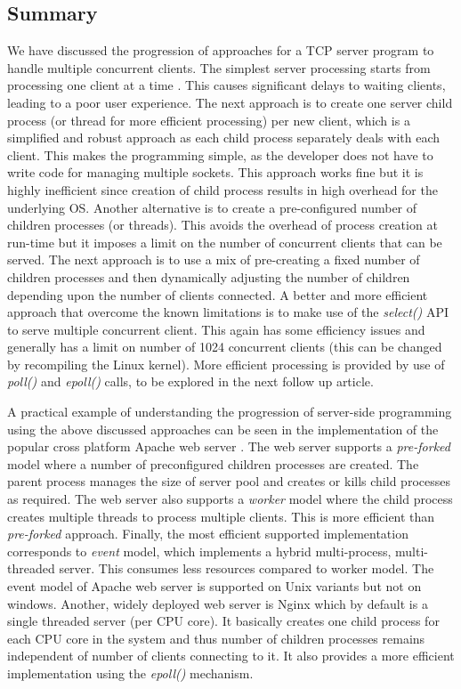 \begin{multicols}{2}
\section{Summary}

We have discussed the progression of approaches for a TCP server program to handle multiple concurrent clients. The simplest server processing starts from processing one client at a time . This causes significant delays to waiting clients, leading to a poor user experience. The next approach is to create one server child process (or thread for more efficient processing) per new client, which is a simplified and robust approach as each child process separately deals with each client. This makes the programming simple, as the developer does not have to write code for managing multiple sockets. This approach works fine but it is highly inefficient since creation of child process results in high overhead for the underlying OS. Another alternative is to create a pre-configured number of children processes (or threads). This avoids the overhead of process creation at run-time but it imposes a limit on the number of concurrent clients that can be served. The next approach is to use a mix of pre-creating a fixed number of children processes and then dynamically adjusting the number of children depending upon the number of clients connected. A better and more efficient approach that overcome the known limitations is to make use of the \textit{select()} API to serve multiple concurrent client. This again has some efficiency issues and generally has a limit on number of 1024 concurrent clients (this can be changed by recompiling the Linux kernel). More efficient processing is provided by use of \textit{poll()} and \textit{epoll()} calls, to be explored in the next follow up article.

A practical example of understanding the progression of server-side programming using the above discussed approaches can be seen in the implementation of the popular cross platform Apache web server \cite{art1-key04}. The web server supports a \textit{pre-forked} model where a number of preconfigured children processes are created. The parent process manages the size of server pool and creates or kills child processes as required. The web server also supports a \textit{worker} model where the child process creates multiple threads to process multiple clients. This is more efficient than \textit{pre-forked} approach. Finally, the most efficient supported implementation corresponds to \textit{event} model, which implements a hybrid multi-process, multi-threaded server. This consumes less resources compared to worker model. The event model of Apache web server is supported on Unix variants but not on windows. Another, widely deployed web server is Nginx \cite{art1-key05} which by default is a single threaded server (per CPU core). It basically creates one child process for each CPU core in the system and thus number of children processes remains independent of number of clients connecting to it. It also provides a more efficient implementation using the \textit{epoll()} mechanism.


\end{multicols}
